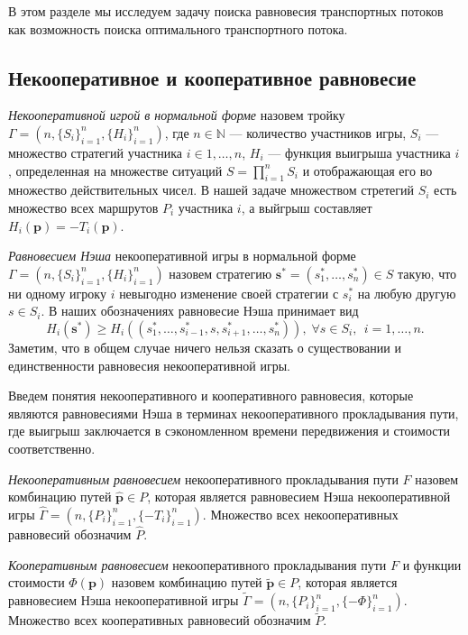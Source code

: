 \documentclass[12pt, a4paper]{article}
\begin{document}
В этом разделе мы исследуем задачу поиска равновесия транспортных потоков как возможность поиска оптимального транспортного потока.

\subsection{Некооперативное и кооперативное равновесие}

\textit{Некооперативной игрой в нормальной форме} назовем тройку $\Gamma = (n, \{S_i\}_{i = 1}^n, \{H_i\}_{i = 1}^n)$, где $n \in \mathbb{N}$ --- количество участников игры, $S_i$ --- множество стратегий участника $i \in {1, \dots, n}$, $H_i$ --- функция выигрыша участника $i$, определенная на множестве ситуаций $S = \prod\limits_{i = 1}^n S_i$ и отображающая его во множество действительных чисел. В нашей задаче множеством стретегий $S_i$ есть множество всех маршрутов $P_i$ участника $i$, а выйгрыш составляет $H_i(\textbf{p}) = -T_i(\textbf{p})$.

\textit{Равновесием Нэша} некооперативной игры в нормальной форме $\Gamma = (n, \{S_i\}_{i = 1}^n, \{H_i\}_{i = 1}^n)$ назовем стратегию $\textbf{s}^* = (s^*_1,\dots, s^*_n) \in S$ такую, что ни одному игроку $i$ невыгодно изменение своей стратегии с $s_i^*$ на любую другую $s \in S_i$. В наших обозначениях равновесие Нэша принимает вид
$$H_i(\textbf{s}^*) \ge H_i(\left(s^*_1, \ldots, s^*_{i - 1}, s, s^*_{i + 1}, \ldots, s^*_{n} \right)), \; \forall s \in S_i, \; \, i = 1, \dots, n. $$ 
Заметим, что в общем случае ничего нельзя сказать о существовании и единственности равновесия некооперативной игры.

Введем понятия некооперативного и кооперативного равновесия, которые являются равновесиями Нэша в терминах некооперативного прокладывания пути, где выигрыш заключается в сэкономленном времени передвижения и стоимости соответственно.

\textit{Некооперативным равновесием} некооперативного прокладывания пути $F$ назовем комбинацию путей $\widehat{\textbf{p}} \in P$, которая является равновесием Нэша некооперативной игры $\widehat{\Gamma} = (n, \{P_i\}_{i = 1}^n, \{-T_i\}_{i = 1}^n)$. Множество всех некооперативных равновесий обозначим $\widehat{P}$.

\textit{Кооперативным равновесием} некооперативного прокладывания пути $F$ и функции стоимости $\Phi (\textbf{p})$ назовем комбинацию путей $\widetilde{\textbf{p}} \in P$, которая является равновесием Нэша некооперативной игры $\widetilde{\Gamma} = (n, \{P_i\}_{i = 1}^n, \{-\Phi\}_{i = 1}^n)$. Множество всех кооперативных равновесий обозначим $\widetilde{P}$.
\end{document}
